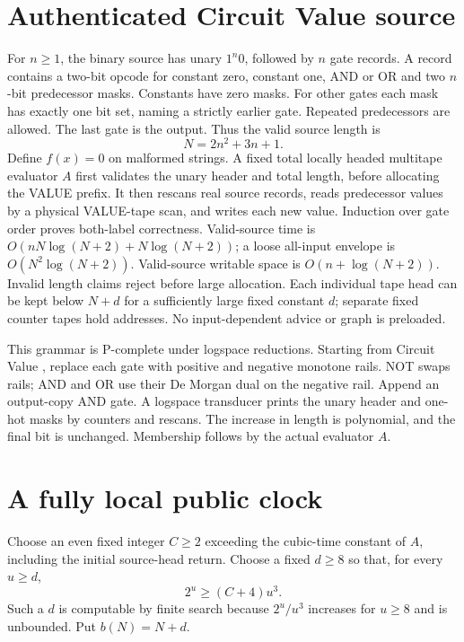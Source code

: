 \documentclass[11pt]{article}
\begin{document}
\section{Authenticated Circuit Value source}
For $n\geq1$, the binary source has unary $1^n0$, followed by $n$ gate
records. A record contains a two-bit opcode for constant zero, constant
one, AND or OR and two $n$-bit predecessor masks. Constants have zero
masks. For other gates each mask has exactly one bit set, naming a
strictly earlier gate. Repeated predecessors are allowed. The last gate
is the output. Thus the valid source length is
\[
N=2n^2+3n+1.
\]
Define $f(x)=0$ on malformed strings. A fixed total locally headed
multitape evaluator $A$ first validates the unary header and total length,
before allocating the VALUE prefix. It then rescans real source records,
reads predecessor values by a physical VALUE-tape scan, and writes each
new value. Induction over gate order proves both-label correctness.
Valid-source time is $O(nN\log(N+2)+N\log(N+2))$; a loose all-input
envelope is $O(N^2\log(N+2))$. Valid-source writable space is
$O(n+\log(N+2))$. Invalid length claims reject before large allocation.
Each individual tape head can be kept below $N+d$ for a sufficiently
large fixed constant $d$; separate fixed counter tapes hold addresses.
No input-dependent advice or graph is preloaded.

This grammar is P-complete under logspace reductions. Starting from
Circuit Value \cite{Ladner1975}, replace each gate with positive and
negative monotone rails. NOT swaps rails; AND and OR use their De Morgan
dual on the negative rail. Append an output-copy AND gate. A logspace
transducer prints the unary header and one-hot masks by counters and
rescans. The increase in length is polynomial, and the final bit is
unchanged. Membership follows by the actual evaluator $A$.

\section{A fully local public clock}
Choose an even fixed integer $C\geq2$ exceeding the cubic-time constant
of $A$, including the initial source-head return. Choose a fixed $d\geq8$
so that, for every $u\geq d$,
\[
2^u\geq(C+4)u^3.
\]
Such a $d$ is computable by finite search because $2^u/u^3$ increases
for $u\geq8$ and is unbounded. Put $b(N)=N+d$.
\end{document}
